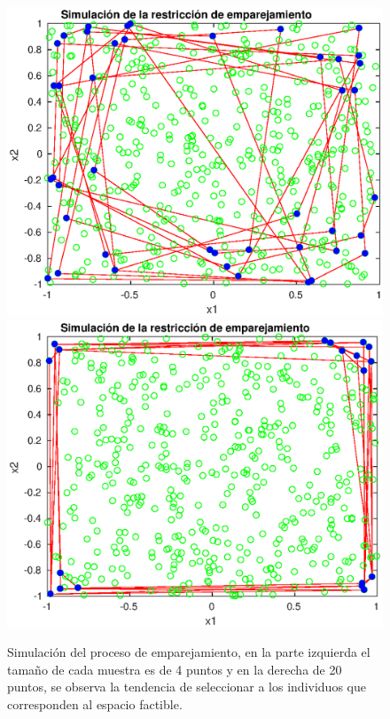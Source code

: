 \begin{figure}[H]
\centering
\scriptsize
\includegraphics[scale=0.4]
{Figures_Chapter4/Mating_sample_4_points_500_gen_10.eps}
\includegraphics[scale=0.4]
{Figures_Chapter4/Mating_sample_20_points_500_gen_10.eps}
\decoRule
\caption{Simulación del proceso de emparejamiento, en la parte izquierda el tamaño de cada muestra es de 4 puntos y en la derecha de 20 puntos, se observa la tendencia de seleccionar a los individuos que corresponden al espacio factible.}
\label{fig:Simulacion_Mating}
\end{figure}

